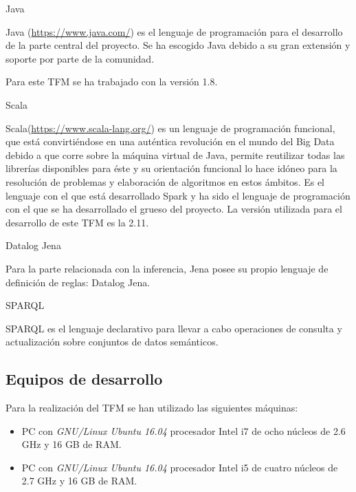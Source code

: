 \begin{definitionlist} 

\item[Java]

Java (\url{https://www.java.com/}) es el lenguaje de programación para el
desarrollo de la parte central del proyecto. Se ha escogido Java debido a su
gran extensión y soporte por parte de la comunidad. 

Para este \acs{TFM} se ha trabajado con la versión 1.8.

\item[Scala]

  Scala(\url{https://www.scala-lang.org/}) es un lenguaje de programación
  funcional, que está convirtiéndose en una auténtica revolución en el mundo del
  Big Data debido a que corre sobre la máquina virtual de Java, permite
  reutilizar todas las librerías disponibles para éste y su orientación
  funcional lo hace idóneo para la resolución de problemas y elaboración de
  algoritmos en estos ámbitos. Es el lenguaje con el
  que está desarrollado Spark y ha sido el lenguaje de programación con el que
  se ha desarrollado el grueso del proyecto. La versión utilizada para el desarrollo de este
  \acs{TFM} es la 2.11.


\item[Datalog Jena]

Para la parte relacionada con la inferencia, Jena posee su propio lenguaje de
definición de reglas: Datalog Jena. 



\item[\acs{SPARQL}]

\acs{SPARQL} es el lenguaje declarativo para llevar a cabo operaciones de
consulta y actualización sobre conjuntos de datos semánticos. 

\end{definitionlist}

\subsection{Equipos de desarrollo}
\label{equipos-desarrollo}
Para la realización del \acs{TFM} se han utilizado las siguientes máquinas: 

\begin{itemize}
\item PC con \textit{GNU/Linux Ubuntu 16.04} procesador Intel i7
  de ocho núcleos de 2.6 GHz y 16 GB de RAM.
\item PC con \textit{GNU/Linux Ubuntu 16.04} procesador Intel i5
  de cuatro núcleos de 2.7 GHz y 16 GB de RAM.   
\end{itemize}

